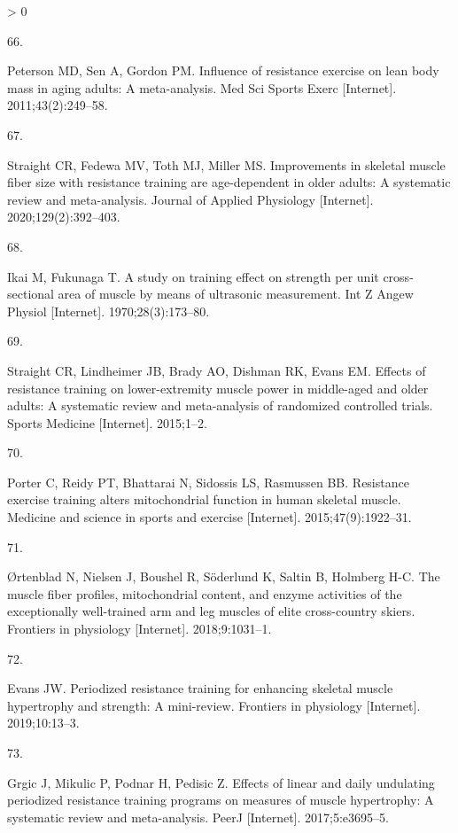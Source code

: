 \documentclass[twoside,10pt]{gihclass} %
\newlength{\cslhangindent}
\newlength{\csllabelwidth}
\newenvironment{CSLReferences}[3] %
 {%
  \setlength{\parindent}{0pt}
  \ifodd #1 \everypar{\setlength{\hangindent}{\cslhangindent}}\ignorespaces\fi
  \ifnum #2 > 0
  \setlength{\parskip}{#2\baselineskip}
  \fi
 }%
 {}
\newcommand{\CSLLeftMargin}[1]{\parbox[t]{\maxof{\widthof{#1}}{\csllabelwidth}}{#1}}
\newcommand{\CSLRightInline}[1]{\parbox[t]{\linewidth}{#1}}
\begin{document}
\begin{CSLReferences}{0}{0}
\leavevmode\hypertarget{ref-RN752}{}%
\CSLLeftMargin{66. }
\CSLRightInline{Peterson MD, Sen A, Gordon PM. Influence of resistance exercise on lean body mass in aging adults: A meta-analysis. Med Sci Sports Exerc {[}Internet{]}. 2011;43(2):249--58. }

\leavevmode\hypertarget{ref-RN2669}{}%
\CSLLeftMargin{67. }
\CSLRightInline{Straight CR, Fedewa MV, Toth MJ, Miller MS. Improvements in skeletal muscle fiber size with resistance training are age-dependent in older adults: A systematic review and meta-analysis. Journal of Applied Physiology {[}Internet{]}. 2020;129(2):392--403. }

\leavevmode\hypertarget{ref-RN2629}{}%
\CSLLeftMargin{68. }
\CSLRightInline{Ikai M, Fukunaga T. A study on training effect on strength per unit cross-sectional area of muscle by means of ultrasonic measurement. Int Z Angew Physiol {[}Internet{]}. 1970;28(3):173--80. }

\leavevmode\hypertarget{ref-RN1710}{}%
\CSLLeftMargin{69. }
\CSLRightInline{Straight CR, Lindheimer JB, Brady AO, Dishman RK, Evans EM. Effects of resistance training on lower-extremity muscle power in middle-aged and older adults: A systematic review and meta-analysis of randomized controlled trials. Sports Medicine {[}Internet{]}. 2015;1--2. }

\leavevmode\hypertarget{ref-RN2608}{}%
\CSLLeftMargin{70. }
\CSLRightInline{Porter C, Reidy PT, Bhattarai N, Sidossis LS, Rasmussen BB. Resistance exercise training alters mitochondrial function in human skeletal muscle. Medicine and science in sports and exercise {[}Internet{]}. 2015;47(9):1922--31. }

\leavevmode\hypertarget{ref-RN2615}{}%
\CSLLeftMargin{71. }
\CSLRightInline{Ørtenblad N, Nielsen J, Boushel R, Söderlund K, Saltin B, Holmberg H-C. The muscle fiber profiles, mitochondrial content, and enzyme activities of the exceptionally well-trained arm and leg muscles of elite cross-country skiers. Frontiers in physiology {[}Internet{]}. 2018;9:1031--1. }

\leavevmode\hypertarget{ref-RN2575}{}%
\CSLLeftMargin{72. }
\CSLRightInline{Evans JW. Periodized resistance training for enhancing skeletal muscle hypertrophy and strength: A mini-review. Frontiers in physiology {[}Internet{]}. 2019;10:13--3. }

\leavevmode\hypertarget{ref-RN2572}{}%
\CSLLeftMargin{73. }
\CSLRightInline{Grgic J, Mikulic P, Podnar H, Pedisic Z. Effects of linear and daily undulating periodized resistance training programs on measures of muscle hypertrophy: A systematic review and meta-analysis. PeerJ {[}Internet{]}. 2017;5:e3695--5. }


\end{CSLReferences}
\end{document}
